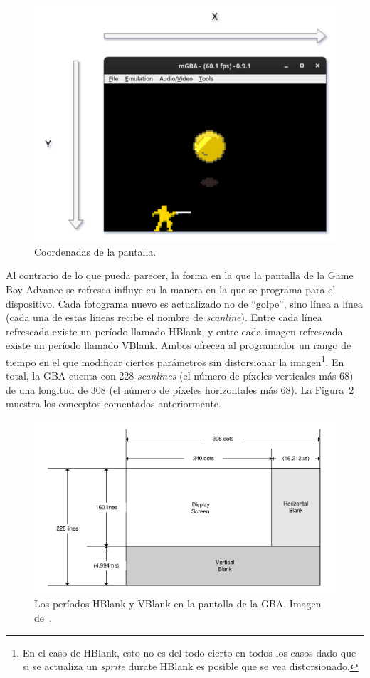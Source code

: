 \begin{figure}[h]
	\centering
	\includegraphics[width=.7\textwidth]{capitulos/capitulo3/y_x.png}
	\caption{Coordenadas de la pantalla.}
	\label{fig:y_x}
\end{figure}
\FloatBarrier

Al contrario de lo que pueda parecer, la forma en la que la pantalla de la Game Boy Advance se refresca influye en la manera en la que se programa para el dispositivo. Cada fotograma nuevo es actualizado no de ``golpe'', sino línea a línea (cada una de estas líneas recibe el nombre de \textit{scanline}). Entre cada línea refrescada existe un período llamado HBlank, y entre cada imagen refrescada existe un período llamado VBlank. Ambos ofrecen al programador un rango de tiempo en el que modificar ciertos parámetros sin distorsionar la imagen\footnote{En el caso de HBlank, esto no es del todo cierto en todos los casos dado que si se actualiza un \textit{sprite} durate HBlank es posible que se vea distorsionado.}. En total, la GBA cuenta con 228 \textit{scanlines} (el número de píxeles verticales más 68) de una longitud de 308 (el número de píxeles horizontales más 68). La Figura~\ref{fig:vblank_hblank} muestra los conceptos comentados anteriormente.

\begin{figure}[h]
	\centering
	\includegraphics[width=.7\textwidth]{capitulos/capitulo3/lcd.png}
	\caption{Los períodos HBlank y VBlank en la pantalla de la GBA\@. Imagen de~\cite{bib:gba_manual}.}
	\label{fig:vblank_hblank}
\end{figure}
\FloatBarrier

